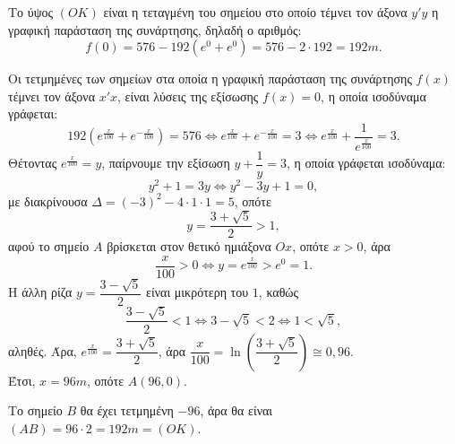 \begin{alist}
\item Το ύψος $(OK)$ είναι η τεταγμένη του σημείου στο οποίο τέμνει τον άξονα $y'y$ η γραφική παράσταση της συνάρτησης, δηλαδή ο αριθμός:
\[f(0) = 576 - 192(e^0 + e^0) = 576 - 2\cdot 192 = 192 m.\]
\item Οι τετμημένες των σημείων στα οποία η γραφική παράσταση της συνάρτησης $f(x)$ τέμνει τον άξονα $x'x$, είναι λύσεις της εξίσωσης $f(x) = 0$, η οποία ισοδύναμα γράφεται:
\[192\left(e^{\frac{x}{100}} + e^{-\frac{x}{100}}\right) = 576 \Leftrightarrow e^{\frac{x}{100}} + e^{-\frac{x}{100}} = 3 \Leftrightarrow e^{\frac{x}{100}} + \frac{1}{e^{\frac{x}{100}}} = 3.\]
Θέτοντας $e^{\frac{x}{100}} = y$, παίρνουμε την εξίσωση $y + \dfrac{1}{y} = 3$, η οποία γράφεται ισοδύναμα:
\[y^2 + 1 = 3y \Leftrightarrow y^2 - 3y + 1 = 0,\]
με διακρίνουσα $\Delta = (-3)^2 - 4\cdot 1\cdot 1 = 5$, οπότε
\[y = \frac{3+\sqrt{5}}{2} > 1,\]
αφού το σημείο $A$ βρίσκεται στον θετικό ημιάξονα $Ox$, οπότε $x > 0$, άρα
\[\frac{x}{100} > 0 \Leftrightarrow y = e^{\frac{x}{100}} > e^0 = 1.\]
Η άλλη ρίζα $y = \dfrac{3-\sqrt{5}}{2}$ είναι μικρότερη του $1$, καθώς
\[\frac{3-\sqrt{5}}{2} < 1 \Leftrightarrow 3 - \sqrt{5} < 2 \Leftrightarrow 1 < \sqrt{5},\]
αληθές.
Άρα, $e^{\frac{x}{100}} = \dfrac{3+\sqrt{5}}{2}$, άρα $\dfrac{x}{100} = \ln\left(\dfrac{3+\sqrt{5}}{2}\right) \cong 0{,}96$. \\
Έτσι, $x = 96 m$, οπότε $A(96, 0)$.
\item Το σημείο $B$ θα έχει τετμημένη $-96$, άρα θα είναι $(AB) = 96\cdot 2 = 192 m = (OK)$.
\end{alist}

